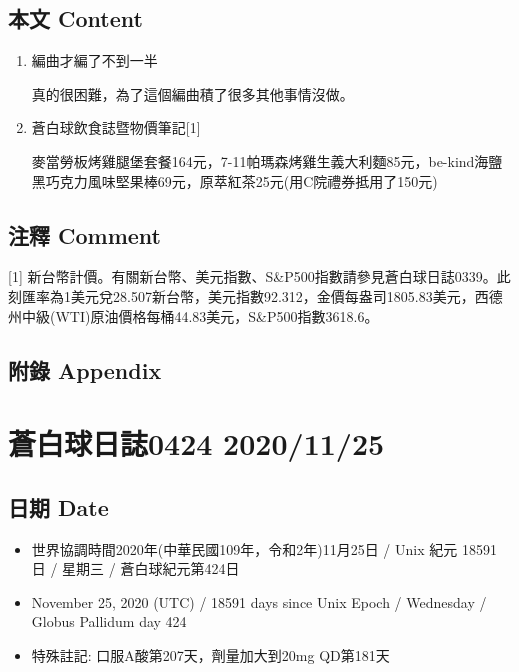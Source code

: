 \documentclass[a5paper, 11pt
]{book}
\providecommand{\tightlist}{%
  \setlength{\itemsep}{0pt}\setlength{\parskip}{0pt}}
\begin{document}
\hypertarget{ux672cux6587-content-75}{%
\subsection{本文 Content}\label{ux672cux6587-content-75}}

\begin{enumerate}
\def\labelenumi{\arabic{enumi}.}
\item
  編曲才編了不到一半

  真的很困難，為了這個編曲積了很多其他事情沒做。
\item
  蒼白球飲食誌暨物價筆記{[}1{]}

  麥當勞板烤雞腿堡套餐164元，7-11帕瑪森烤雞生義大利麵85元，be-kind海鹽黑巧克力風味堅果棒69元，原萃紅茶25元(用C院禮券抵用了150元)
\end{enumerate}

\hypertarget{ux6ce8ux91cb-comment-75}{%
\subsection{注釋 Comment}\label{ux6ce8ux91cb-comment-75}}

{[}1{]}
新台幣計價。有關新台幣、美元指數、S\&P500指數請參見蒼白球日誌0339。此刻匯率為1美元兌28.507新台幣，美元指數92.312，金價每盎司1805.83美元，西德州中級(WTI)原油價格每桶44.83美元，S\&P500指數3618.6。

\hypertarget{ux9644ux9304-appendix-75}{%
\subsection{附錄 Appendix}\label{ux9644ux9304-appendix-75}}

\hypertarget{ux84bcux767dux7403ux65e5ux8a8c0424-20201125}{%
\section{蒼白球日誌0424
2020/11/25}\label{ux84bcux767dux7403ux65e5ux8a8c0424-20201125}}

\hypertarget{ux65e5ux671f-date-76}{%
\subsection{日期 Date}\label{ux65e5ux671f-date-76}}

\begin{itemize}
\tightlist
\item
  世界協調時間2020年(中華民國109年，令和2年)11月25日 / Unix 紀元 18591
  日 / 星期三 / 蒼白球紀元第424日
\item
  November 25, 2020 (UTC) / 18591 days since Unix Epoch / Wednesday /
  Globus Pallidum day 424
\item
  特殊註記: 口服A酸第207天，劑量加大到20mg QD第181天
\end{itemize}
\end{document}
